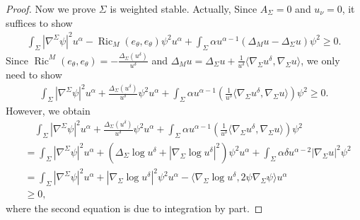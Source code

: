 \documentclass[10pt,a4paper]{amsart}
\DeclareMathOperator{\Ric}{Ric}
\begin{document}
\begin{proof}
Now we prove $\Sigma$ is weighted stable. Actually, Since $A_{\Sigma}=0$ and $u_{\nu}=0$, it suffices to show
\begin{equation*}
        \begin{split}
            \int_{\Sigma}|\nabla^{\Sigma}\psi|^2 u^{\alpha}-\Ric_M(e_{\theta},e_{\theta})\psi^2 u^{\alpha} +\int_{\Sigma}\alpha u^{\alpha-1}\left(\Delta_M u-\Delta_{\Sigma} u\right)\psi^2\geq 0.
        \end{split}
    \end{equation*}
Since $\Ric^{M}(e_{\theta},e_{\theta} )=-\frac{\Delta_{\Sigma}(u^{\delta})}{u^{\delta}}$ and $\Delta_{M}u=\Delta_{\Sigma}u+\frac{1}{u^{\delta}}\langle \nabla_{\Sigma}u^{\delta},\nabla_{\Sigma}u\rangle$, we only need to show
\begin{equation*}
        \begin{split}
            \int_{\Sigma}|\nabla^{\Sigma}\psi|^2 u^{\alpha}+\frac{\Delta_{\Sigma}(u^{\delta})}{u^{\delta}}\psi^2 u^{\alpha} +\int_{\Sigma}\alpha u^{\alpha-1}\left(\frac{1}{u^{\delta}}\langle \nabla_{\Sigma}u^{\delta},\nabla_{\Sigma}u\rangle\right)\psi^2\geq 0.
        \end{split}
    \end{equation*}
However, we obtain
\begin{equation*}
        \begin{split}
            &\quad\int_{\Sigma}|\nabla^{\Sigma}\psi|^2 u^{\alpha}+\frac{\Delta_{\Sigma}(u^{\delta})}{u^{\delta}}\psi^2 u^{\alpha} +\int_{\Sigma}\alpha u^{\alpha-1}\left(\frac{1}{u^{\delta}}\langle \nabla_{\Sigma}u^{\delta},\nabla_{\Sigma}u\rangle\right)\psi^2\\
            &=\int_{\Sigma}|\nabla^{\Sigma}\psi|^2 u^{\alpha}+\left(\Delta_{\Sigma}\log u^{\delta}+|\nabla_{\Sigma}\log u^{\delta}|^2\right)\psi^2 u^{\alpha} +\int_{\Sigma}\alpha\delta u^{\alpha-2}|\nabla_{\Sigma}u|^2\psi^2\\
            &=\int_{\Sigma}|\nabla^{\Sigma}\psi|^2 u^{\alpha}+|\nabla_{\Sigma}\log u^{\delta}|^2\psi^2 u^{\alpha} -\langle \nabla_{\Sigma}\log u^{\delta},2\psi\nabla_{\Sigma}\psi\rangle u^{\alpha}\\
            &\geq 0,
        \end{split}
    \end{equation*}
    where the second equation is due to integration by part.
\end{proof}
\end{document}
